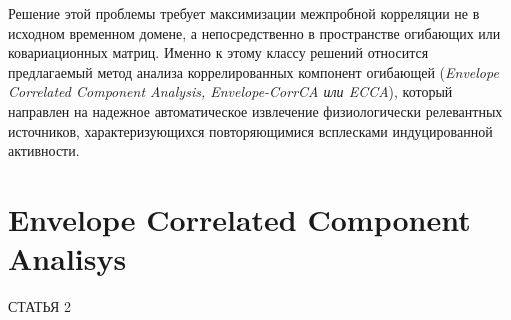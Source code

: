 Решение этой проблемы требует максимизации межпробной корреляции не в исходном временном домене, а непосредственно в пространстве огибающих или ковариационных матриц. Именно к этому классу решений относится предлагаемый метод анализа коррелированных компонент огибающей (\textit{Envelope Correlated Component Analysis, Envelope-CorrCA или ECCA}), который направлен на надежное автоматическое извлечение физиологически релевантных источников, характеризующихся повторяющимися всплесками индуцированной активности.

\section{Envelope Correlated Component Analisys}
\label{sec:envcorrca}

СТАТЬЯ 2
